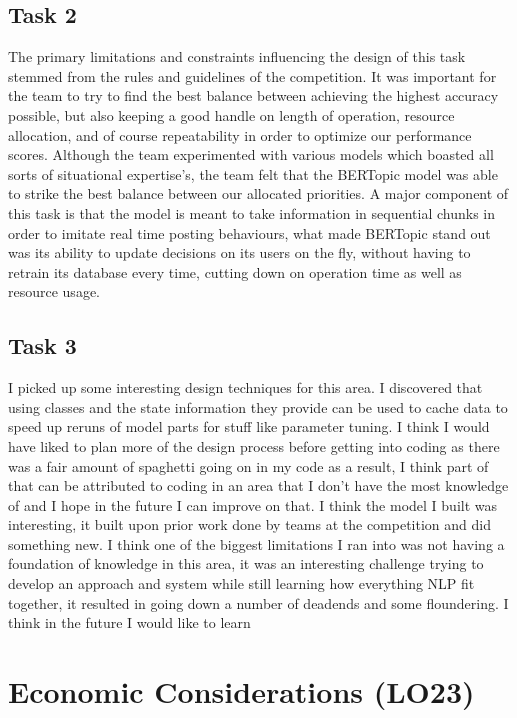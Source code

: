\documentclass{article}
\begin{document}
\subsection{Task 2}
The primary limitations and constraints influencing the design of this task stemmed from the rules and guidelines of the competition. It was important for the team to try to find the best balance between achieving the highest accuracy possible, but also keeping a good handle on length of operation, resource allocation, and of course repeatability in order to optimize our performance scores. Although the team experimented with various models which boasted all sorts of situational expertise's, the team felt that the BERTopic model was able to strike the best balance between our allocated priorities. A major component of this task is that the model is meant to take information in sequential chunks in order to imitate real time posting behaviours, what made BERTopic stand out was its ability to update decisions on its users on the fly, without having to retrain its database every time, cutting down on operation time as well as resource usage.

\subsection{Task 3}

I picked up some interesting design techniques for this area. I discovered that using classes and the state information they provide can be used to cache data to speed up reruns of model parts for stuff like parameter tuning. I think I would have liked to plan more of the design process before getting into coding as there was a fair amount of spaghetti going on in my code as a result, I think part of that can be attributed to coding in an area that I don't have the most knowledge of and I hope in the future I can improve on that. I think the model I built was interesting, it built upon prior work done by teams at the competition and did something new. I think one of the biggest limitations I ran into was not having a foundation of knowledge in this area, it was an interesting challenge trying to develop an approach and system while still learning how everything NLP fit together, it resulted in going down a number of deadends and some floundering. I think in the future I would like to learn 

\section{Economic Considerations (LO23)}
\end{document}
